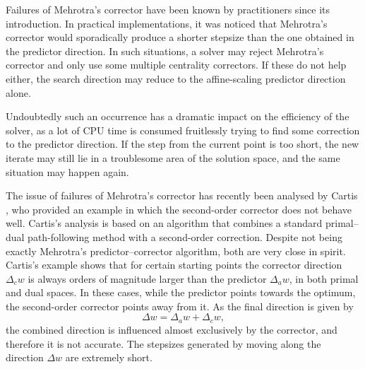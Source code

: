 
Failures of Mehrotra's corrector have been known by practitioners 
since its introduction. In practical implementations, it was noticed 
that Mehrotra's corrector would sporadically produce a shorter stepsize 
than the one obtained in the predictor direction. 
In such situations, a solver may reject Mehrotra's corrector 
and only use some multiple centrality correctors. 
If these do not help either, the search direction may reduce
to the affine-scaling predictor direction alone.

Undoubtedly such an occurrence has a dramatic impact on the 
efficiency of the solver, as a lot of CPU time is consumed
fruitlessly trying to find some correction to the predictor
direction.
If the step from the current point is too short, the new iterate may
still lie in a troublesome area of the solution space, and the
same situation may happen again.


The issue of failures of Mehrotra's corrector
has recently been analysed by Cartis \cite{Cartis04}, 
who provided an example in which the second-order corrector does 
not behave well. Cartis's analysis is based on an algorithm 
that combines a standard primal--dual path-following method with 
a second-order correction. Despite not being exactly Mehrotra's 
predictor--corrector algorithm, both are very close in spirit.
Cartis's example \cite{Cartis04} shows that for certain 
starting points the corrector direction $\Delta_c w$
is always orders of magnitude larger than the predictor $\Delta_a w$, in both 
primal and dual spaces.
In these cases, while the predictor points towards 
the optimum, the second-order corrector points away from it.
As the final direction is given by
\[
\Delta w = \Delta_a w  +\Delta_c w,
\]
the combined direction is influenced almost exclusively by the corrector, 
and therefore it is not accurate. 
The stepsizes generated by moving along the direction $\Delta w$
are extremely short.


